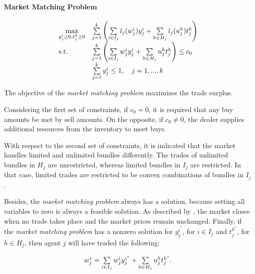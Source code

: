 \paragraph*{Market Matching Problem}

\begin{equation}
    \begin{array}{ll@{}ll}
        \underset{y_{j}^{i} \geq 0, t_{j}^{h} \geq 0 }{\text{max}}  & 
            \sum\limits_{j=1}^{k}
            \left(\sum\limits_{i \in I_{j}}^{} l_{j}(w_{j}^{i})y_{j}^{i} + 
            \sum\limits_{h \in H_{j}}^{} l_{j}(u_{j}^{h})t_{j}^{h} \right) &\\
        \text{s.t.}
            & \sum\limits_{j=1}^{k}
            \left(\sum\limits_{i \in I_{j}}^{} w_{j}^{i}y_{j}^{i} + 
            \sum\limits_{h \in H_{j}}^{} u_{j}^{h}t_{j}^{h} \right) \leq c_{0} \\
            & \sum\limits_{j=1}^{k} y_{j}^{i} \leq 1, \quad j=1 ,..., k
    \end{array}
\end{equation}

The objective of the \textit{market matching problem} maximizes the trade surplus. 

Considering the first set of constraints, if $c_{0} = 0$, it is required that any buy amounts be met by sell amounts. 
On the opposite, if $c_{0} \neq 0$, the dealer supplies additional resources from the inventory
to meet buys. 

With respect to the second set of constraints, it is indicated that the market handles limited and unlimited bundles 
differently. The trades of unlimited bundles in $H_{j}$ are unrestricted, whereas limited bundles in $I_{j}$
are restricted. In that case, limited trades are restricted to be convex combinations of bundles in $I_{j}$.

Besides, the \textit{market matching problem} always has a solution, because setting all variables to zero 
is always a feasible solution. As described by , the market closes when no trade takes place 
and the market prices remain unchanged. Finally, if the \textit{market matching problem} has a nonzero solution for
 $y_{j}^{i^{*}}$, for $i \in I_{j}$ and $t_{j}^{h^{*}}$, for $h \in H_{j}$, then agent $j$ will have traded the following:

 \begin{equation*}
    \begin{array}{ll@{}ll}
        w_{j}^{*} = 
        \sum\limits_{i \in I_{j}}^{} w_{j}^{i}y_{j}^{i^{*}} + 
        \sum\limits_{h \in H_{j}}^{} u_{j}^{h}t_{j}^{h^{*}}.
    \end{array}
\end{equation*}

